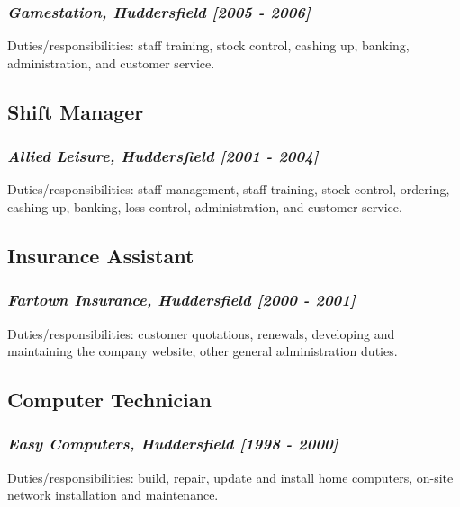 \documentclass{article}
\begin{document}
\subsubsection*{\emph{Gamestation, Huddersfield [2005 - 2006]}}
Duties/responsibilities: staff training, stock control, cashing up, banking, administration, and customer service.
\subsection*{Shift Manager}
\subsubsection*{\emph{Allied Leisure, Huddersfield [2001 - 2004]}}
Duties/responsibilities: staff management, staff training, stock control, ordering, cashing up, banking, loss control, administration, and customer service.
\subsection*{Insurance Assistant}
\subsubsection*{\emph{Fartown Insurance, Huddersfield [2000 - 2001]}}
Duties/responsibilities: customer quotations, renewals, developing and maintaining the company website, other general administration duties.
\subsection*{Computer Technician}
\subsubsection*{\emph{Easy Computers, Huddersfield [1998 - 2000]}}
Duties/responsibilities: build, repair, update and install home computers, on-site network installation and maintenance.
\end{document}
